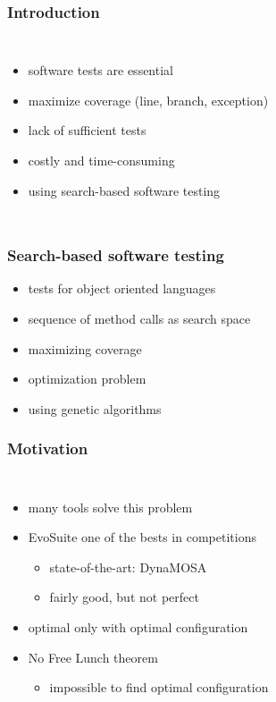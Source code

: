 \begin{frame}
	\frametitle{Introduction}
	
	\begin{columns}[c]
		
		\column{\textwidth}
		\begin{itemize}
			\item software tests are essential
			\item maximize coverage (line, branch, exception)
			\item lack of sufficient tests
			\item costly and time-consuming
			\item using search-based software testing
		\end{itemize}
		
	\end{columns}
	
\end{frame}

\begin{frame}
	\frametitle{Search-based software testing}
	
	\begin{itemize}
		\item tests for object oriented languages
		\item sequence of method calls as search space
		\item maximizing coverage
		\item optimization problem
		\item using genetic algorithms
	\end{itemize}
			
	
\end{frame}

\begin{frame}
	\frametitle{Motivation}
	
	\begin{columns}[c]
		
		\column{\textwidth}
		\begin{itemize}
			\item many tools solve this problem
			\item EvoSuite one of the bests in competitions \cite{Panichella.2020}
			\begin{itemize}
				\item state-of-the-art: DynaMOSA  
				\item fairly good, but not perfect \cite{Arcuri.2014}
			\end{itemize}
			\item optimal only with optimal configuration
			\item No Free Lunch theorem \cite{Wolpert.1997}
				\begin{itemize}
					\item impossible to find optimal configuration
				\end{itemize}
		\end{itemize}
		
	\end{columns}
	
\end{frame}

